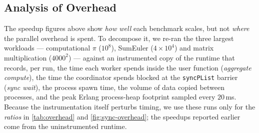 
\subsection{Analysis of Overhead}\label{sec:overhead-analysis}

The speedup figures above show \emph{how well} each benchmark scales, but not
\emph{where} the parallel overhead is spent. To decompose it, we re-ran the
three largest workloads --- computational $\pi$ ($10^8$), SumEuler
($4\times10^4$) and matrix multiplication ($4000^2$) --- against an instrumented
copy of the runtime that records, per run, the time each worker spends inside
the user function (\emph{aggregate compute}), the time the coordinator spends
blocked at the \lstinline{syncPList} barrier (\emph{sync wait}), the process
spawn time, the volume of data copied between processes, and the peak
Erlang process-heap footprint sampled every $20$\,ms. Because the instrumentation
itself perturbs timing, we use these runs only for the \emph{ratios} in
\cref{tab:overhead} and \cref{fig:sync-overhead}; the speedups reported earlier come from
the uninstrumented runtime.

\begin{table}
\centering
{}
\caption{Overhead decomposition at each benchmark's peak-speedup worker count
(cf.\ \cref{tab:runtimes}). \emph{Aggr.\ compute} is worker time inside the user
function summed over all workers; \emph{Sync frac.} is coordinator barrier-wait
time as a fraction of wall time; \emph{Spawn} is the total time spent spawning
worker processes per run; \emph{Msg} is data copied between processes per
run; \emph{Mem peak} is the peak process-heap footprint. Means over 10 runs.}
\label{tab:overhead}
\end{table}

